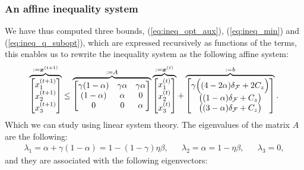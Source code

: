     \subsubsection{An affine inequality system}

    We have thus computed three bounds, (\ref{eq:ineq_opt_aux}), (\ref{eq:ineq_min}) and (\ref{eq:ineq_q_subopt}), which are expressed recursively as functions of the terms,
    this enables us to rewrite the inequality system as the following affine system:
    \begin{align}
        \label{eq:affine_system}
        \overbrace{\begin{bmatrix}
            x_1^{(t+1)}\\
            x_2^{(t+1)}\\
            x_3^{(t+1)} 
        \end{bmatrix}}^{:=\bm{x}^{(t+1)}}
        \leq 
        \overbrace{
            \begin{bmatrix}
                \gamma (1-\alpha) & \gamma \alpha &  \gamma \alpha \\
                 (1-\alpha) & \alpha & 0 \\
                 0 & 0 & \alpha 
            \end{bmatrix}
            }^{:=A}
        \overbrace{\begin{bmatrix}
            x_1^{(t)}\\
            x_2^{(t)}\\
            x_3^{(t)}
        \end{bmatrix}}^{:=\bm{x}^{(t)}}+
        \overbrace{
        \begin{bmatrix}
            \gamma \Bigl(  (4-2\alpha)\delta_\mathcal{F}+2C_z  \Bigr)\\
            \bigl( (1-\alpha) \delta_\mathcal{F} + C_z\bigr) \\
            \bigl((3-\alpha) \delta_\mathcal{F} + C_z\bigr)
        \end{bmatrix}}^{:=b}.
    \end{align}
    Which we can study using linear system theory. The eigenvalues of the matrix $A$ are the following:
    \begin{align*}
        \lambda_1 = \alpha + \gamma (1-\alpha) = 1 - (1-\gamma)\eta\beta, && 
        \lambda_2 = \alpha = 1-\eta\beta, && 
        \lambda_3 = 0,
    \end{align*}
    and they are associated with the following eigenvectors:
